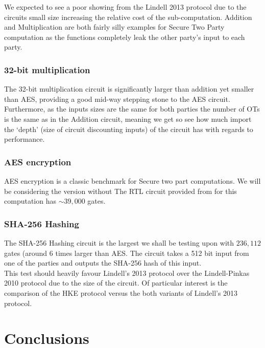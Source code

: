 \documentclass[ %
                    author={Nicholas Tutte},
                supervisor={Prof. Nigel Smart},
                    degree={MEng},
                     title={Secure Two Party Computation},
                  subtitle={A practical comparison of recent protocols},
                      type={Research - GG1K},
                      year={2015} ]{dissertation}
\begin{document}
				We expected to see a poor showing from the Lindell 2013 protocol due to the circuits small size increasing the relative cost of the sub-computation. Addition and Multiplication are both fairly silly examples for Secure Two Party computation as the functions completely leak the other party's input to each party. 

			\subsection{32-bit multiplication}

				The 32-bit multiplication circuit is significantly larger than addition yet smaller than AES, providing a good mid-way stepping stone to the AES circuit. Furthermore, as the inputs sizes are the same for both parties the number of OTs is the same as in the Addition circuit, meaning we get so see how much import the `depth' (size of circuit discounting inputs) of the circuit has with regards to performance.

			\subsection{AES encryption}

				AES encryption is a classic benchmark for Secure two part computations. We will be considering the version without The RTL circuit provided from \cite{NigelCircuits} for this computation has $\sim 39,000$ gates.

			\subsection{SHA-256 Hashing}

				The SHA-256 Hashing circuit is the largest we shall be testing upon with $236,112$ gates (around 6 times larger than AES. The circuit takes a 512 bit input from one of the parties and outputs the SHA-256 hash of this input.\\

				This test should heavily favour Lindell's 2013 protocol over the Lindell-Pinkas 2010 protocol due to the size of the circuit. Of particular interest is the comparison of the HKE protocol versus the both variants of Lindell's 2013 protocol.\\

				


	\chapter{Conclusions}
\end{document}
